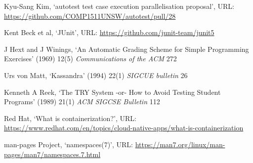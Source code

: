 \documentclass[hidelinks]{report}
\begin{document}
\begin{thebibliography}{99}
Kyu-Sang Kim, ‘autotest test case execution parallelisation proposal’, URL: \url{https://github.com/COMP1511UNSW/autotest/pull/28}

Kent Beck et al, ‘JUnit’, URL: \url{https://github.com/junit-team/junit5}

J Hext and J Winings, ‘An Automatic Grading Scheme for Simple Programming Exercises’ (1969) 12(5) \textit{Communications of the ACM} 272

Urs von Matt, ‘Kassandra’ (1994) 22(1) \textit{SIGCUE bulletin} 26

Kenneth A Reek, ‘The TRY System -or- How to Avoid Testing Student Programs’ (1989) 21(1) \textit{ACM SIGCSE Bulletin} 112

Red Hat, ‘What is containerization?’, URL: \url{https://www.redhat.com/en/topics/cloud-native-apps/what-is-containerization}

man-pages Project, ‘namespaces(7)’, URL: \url{https://man7.org/linux/man-pages/man7/namespaces.7.html}


\end{thebibliography}
\end{document}
